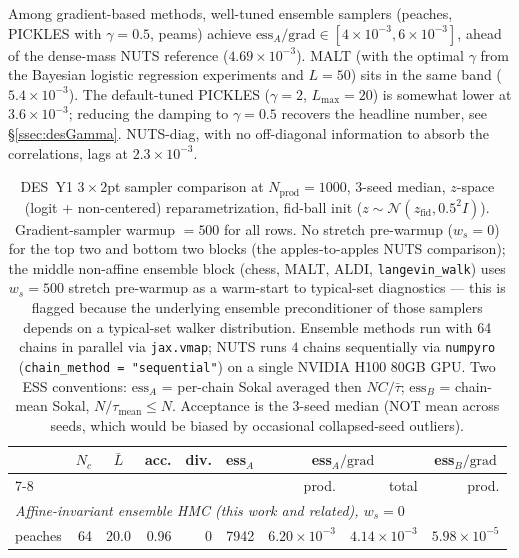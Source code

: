\documentclass{article}
\newcommand{\gN}{\mathcal{N}}
\begin{document}
Among gradient-based methods, well-tuned ensemble samplers (peaches,
PICKLES with $\gamma=0.5$, peams) achieve $\mathrm{ess}_A/\mathrm{grad}\in[4{\times}10^{-3},6{\times}10^{-3}]$, ahead of the dense-mass NUTS reference
($4.69{\times}10^{-3}$).  MALT (with the optimal $\gamma$
from the Bayesian logistic regression experiments and $L=50$) sits in
the same band ($5.4{\times}10^{-3}$). The default-tuned PICKLES ($\gamma=2$,
$L_{\max}=20$) is somewhat lower at $3.6{\times}10^{-3}$; reducing the
damping to $\gamma=0.5$ recovers the headline number, see
\S\ref{ssec:desGamma}. NUTS-diag, with no off-diagonal information to
absorb the correlations, lags at $2.3{\times}10^{-3}$.

\begin{table}[t]
\centering
\caption{DES~Y1 $3\times 2$pt sampler comparison at $N_{\text{prod}} = 1000$,
3-seed median, $z$-space (logit + non-centered) reparametrization,
fid-ball init ($z \sim \gN(z_{\text{fid}}, 0.5^2 I)$).  Gradient-sampler
warmup $= 500$ for all rows.  No stretch pre-warmup ($w_s = 0$) for the
top two and bottom two blocks (the apples-to-apples NUTS comparison);
the middle non-affine ensemble block (chess, MALT, ALDI,
\texttt{langevin\_walk}) uses $w_s = 500$ stretch pre-warmup as a
warm-start to typical-set diagnostics --- this is flagged because the
underlying ensemble preconditioner of those samplers depends on a
typical-set walker distribution.  Ensemble methods run with 64 chains
in parallel via \texttt{jax.vmap}; NUTS runs $4$ chains sequentially via
\texttt{numpyro} (\texttt{chain\_method = "sequential"}) on a single
NVIDIA H100 80GB GPU.  Two ESS conventions: $\mathrm{ess}_A$ = per-chain
Sokal averaged then $NC/\bar\tau$; $\mathrm{ess}_B$ = chain-mean Sokal,
$N/\tau_{\text{mean}} \le N$.  Acceptance is the 3-seed median (NOT mean
across seeds, which would be biased by occasional collapsed-seed
outliers).}
\label{tab:desMain}
\small
\begin{tabular}{l rrrr rrrr}
\toprule
& \multicolumn{1}{c}{$N_c$} & \multicolumn{1}{c}{$\bar L$}
& \multicolumn{1}{c}{acc.} & \multicolumn{1}{c}{div.}
& \multicolumn{1}{c}{ess$_A$} & \multicolumn{2}{c}{ess$_A/\text{grad}$}
& \multicolumn{1}{c}{ess$_B/\text{grad}$} \\
\cmidrule(lr){7-8}
& & & & & & prod. & total & prod. \\
\midrule
\multicolumn{9}{l}{\emph{Affine-invariant ensemble HMC (this work and related),  $w_s = 0$}} \\
peaches                       & 64 & 20.0 & 0.96 & 0 & 7942 & $6.20\!\times\!10^{-3}$ & $4.14\!\times\!10^{-3}$ & $5.98\!\times\!10^{-5}$ \\

\end{tabular}
\end{table}
\end{document}
